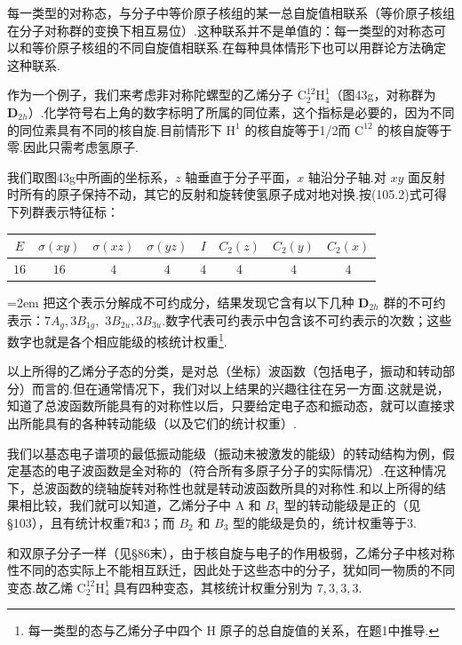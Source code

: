 每一类型的对称态，与分子中等价原子核组的某一总自旋值相联系（等价原子核组在分子对称群的变换下相互易位）.这种联系并不是单值的：每一类型的对称态可以和等价原子核组的不同自旋值相联系.在每种具体情形下也可以用群论方法确定这种联系.

作为一个例子，我们来考虑非对称陀螺型的乙烯分子 $\mathrm{C_2^{12}H_4^1}$（图43g，对称群为 $\boldsymbol{D}_{2h}$）.化学符号右上角的数字标明了所属的同位素，这个指标是必要的，因为不同的同位素具有不同的核自旋.目前情形下 $\mathrm{H}^1$ 的核自旋等于1/2而 $\mathrm{C}^{12}$ 的核自旋等于零.因此只需考虑氢原子.

我们取图43g中所画的坐标系，$z$ 轴垂直于分子平面，$x$ 轴沿分子轴.对 $xy$ 面反射时所有的原子保持不动，其它的反射和旋转使氢原子成对地对换.按(105.2)式可得下列群表示特征标：
\begin{center}
\begin{tabular}{cccccccc}
  $E$ & $\sigma(xy)$ & $\sigma(xz)$ & $\sigma(yz)$ & $I$ & $C_2(z)$ & $C_2(y)$ & $C_2(x)$\\ \hline
  $16$ & $16$ & $4$ & $4$ & $4$ & $4$ & $4$ & $4$\\ \hline
\end{tabular}
\end{center}
\emergencystretch=2em%
把这个表示分解成不可约成分，结果发现它含有以下几种 $\boldsymbol{D}_{2h}$ 群的不可约表示：$7A_g,3B_{1g},$ $3B_{2u},3B_{3u}$.数字代表可约表示中包含该不可约表示的次数；这些数字也就是各个相应能级的核统计权重\footnote{每一类型的态与乙烯分子中四个 H 原子的总自旋值的关系，在题1中推导.}.

\emergencystretch=0pt%


以上所得的乙烯分子态的分类，是对总（坐标）波函数（包括电子，振动和转动部分）而言的.但在通常情况下，我们对以上结果的兴趣往往在另一方面.这就是说，知道了总波函数所能具有的对称性以后，只要给定电子态和振动态，就可以直接求出所能具有的各种转动能级（以及它们的统计权重）.

我们以基态电子谱项的最低振动能级（振动未被激发的能级）的转动结构为例，假定基态的电子波函数是全对称的（符合所有多原子分子的实际情况）.在这种情况下，总波函数的绕轴旋转对称性也就是转动波函数所具的对称性.和以上所得的结果相比较，我们就可以知道，乙烯分子中 A 和 $B_1$ 型的转动能级是正的（见§103），且有统计权重7和3；而 $B_2$ 和 $B_3$ 型的能级是负的，统计权重等于3.

和双原子分子一样（见§86末），由于核自旋与电子的作用极弱，乙烯分子中核对称性不同的态实际上不能相互跃迁，因此处于这些态中的分子，犹如同一物质的不同变态.故乙烯 $\mathrm{C_2^{12}H_4^1}$ 具有四种变态，其核统计权重分别为 $7,3,3,3$.

